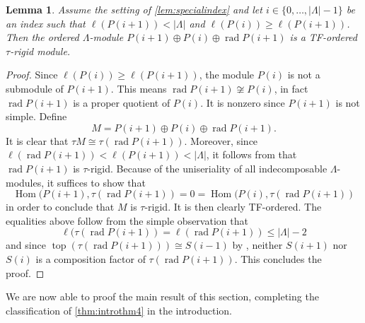 \documentclass[11pt]{amsart}
\DeclareMathOperator{\Hom}{\mathrm{Hom}}
\DeclareMathOperator{\topp}{\mathrm{top}}
\DeclareMathOperator{\rad}{\mathrm{rad}}
\newtheorem{lemma}[theorem]{Lemma}
\theoremstyle{definition}
\begin{document}
    \begin{lemma}\label{lem:specialtaurigid}
        Assume the setting of \cref{lem:specialindex} and let $i \in \{0, \dots, |\Lambda|-1\}$ be an index such that $\ell(P(i+1)) < |\Lambda|$ and $\ell(P(i)) \geq \ell(P(i+1))$. Then the ordered $\Lambda$-module $P(i+1) \oplus P(i) \oplus \rad P(i+1)$ is a TF-ordered $\tau$-rigid module.
    \end{lemma}
    \begin{proof}
        Since $\ell(P(i)) \geq \ell(P(i+1))$, the module $P(i)$ is not a submodule of $P(i+1)$. This means $\rad P(i+1) \not \cong P(i)$, in fact $\rad P(i+1)$ is a proper quotient of $P(i)$. It is nonzero since $P(i+1)$ is not simple. Define 
        \[ M= P(i+1) \oplus P(i) \oplus \rad P(i+1).\]
        It is clear that $\tau M \cong \tau(\rad P(i+1))$. Moreover, since $\ell(\rad P(i+1)) < \ell(P(i+1)) < |\Lambda|$, it follows from \cite[Lem. 2.5]{Adachi2016} that $\rad P(i+1)$ is $\tau$-rigid. Because of the uniseriality of all indecomposable $\Lambda$-modules, it suffices to show that 
        \[ \Hom(P(i+1), \tau (\rad P(i+1))=0 = \Hom(P(i), \tau(\rad P(i+1))\]
        in order to conclude that $M$ is $\tau$-rigid. It is then clearly TF-ordered. The equalities above follow from the simple observation that 
        \[ \ell(\tau(\rad P(i+1)) = \ell(\rad P(i+1)) \leq |\Lambda|-2\]
        and since $\topp(\tau(\rad P(i+1))) \cong S(i-1)$ by \cite[Prop. 4.6(7)(8)]{bkt}, neither $S(i+1)$ nor $S(i)$ is a composition factor of $\tau(\rad P(i+1))$. This concludes the proof.
    \end{proof}

    We are now able to proof the main result of this section, completing the classification of \cref{thm:introthm4} in the introduction.
    
\end{document}
